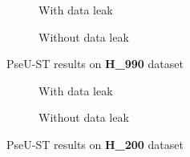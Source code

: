         \begin{figure}[H]
            \centering
            \begin{subfigure}{0.47\textwidth}
              \centering
              \resizebox{\textwidth}{!}{}
              \captionsetup{justification=centering}
              \caption{With data leak}
            \end{subfigure}%
            \hspace{0.05\textwidth}
            \begin{subfigure}{0.47\textwidth}
              \centering
              \resizebox{\textwidth}{!}{}
              \captionsetup{justification=centering}
              \caption{Without data leak}
            \end{subfigure}
            \caption{PseU-ST results on \textbf{H\_990} dataset}\label{fig:pseu-st_h990}
        \end{figure}

        \begin{figure}[H]
            \centering
            \begin{subfigure}{0.45\textwidth}
              \centering
              \resizebox{\textwidth}{!}{}
              \captionsetup{justification=centering}
              \caption{With data leak}
            \end{subfigure}%
            \hspace{0.05\textwidth}
            \begin{subfigure}{0.45\textwidth}
              \centering
              \resizebox{\textwidth}{!}{}
              \captionsetup{justification=centering}
              \caption{Without data leak}
            \end{subfigure}
            \caption{PseU-ST results on \textbf{H\_200} dataset}\label{fig:pseu-st_h200}
        \end{figure}

